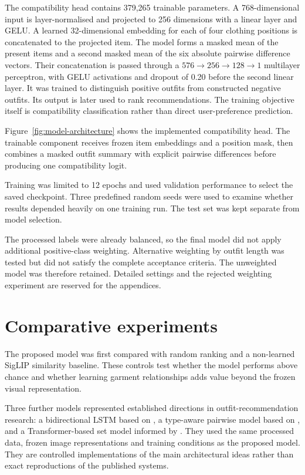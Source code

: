 The compatibility head contains 379,265 trainable parameters. A 768-dimensional
input is layer-normalised and projected to 256 dimensions with a linear layer
and GELU. A learned 32-dimensional embedding for each of four clothing
positions is concatenated to the projected item. The model forms a masked mean
of the present items and a second masked mean of the six absolute pairwise
difference vectors. Their concatenation is passed through a
$576\rightarrow256\rightarrow128\rightarrow1$ multilayer perceptron, with
GELU activations and dropout of 0.20 before the second linear layer. It was
trained to distinguish positive outfits from constructed negative outfits.
Its output is later used to rank recommendations. The training objective itself
is compatibility classification rather than direct user-preference prediction.

Figure~\ref{fig:model-architecture} shows the implemented compatibility head.
The trainable component receives frozen item embeddings and a position mask,
then combines a masked outfit summary with explicit pairwise differences before
producing one compatibility logit.



Training was limited to 12 epochs and used validation performance to select the
saved checkpoint. Three predefined random seeds were used to examine whether
results depended heavily on one training run. The test set was kept separate
from model selection.

The processed labels were already balanced, so the final model did not apply
additional positive-class weighting. Alternative weighting by outfit length
was tested but did not satisfy the complete acceptance criteria. The unweighted
model was therefore retained. Detailed settings and the rejected weighting
experiment are reserved for the appendices.

\section{Comparative experiments}

The proposed model was first compared with random ranking and a non-learned
SigLIP similarity baseline. These controls test whether the model performs
above chance and whether learning garment relationships adds value beyond the
frozen visual representation.

Three further models represented established directions in outfit-recommendation
research: a bidirectional LSTM based on \textcite{han2017bilstm}, a type-aware
pairwise model based on \textcite{vasileva2018typeaware}, and a
Transformer-based set model informed by \textcite{sarkar2023outfittransformer}.
They used the same processed data, frozen image representations and training
conditions as the proposed model. They are controlled implementations of the
main architectural ideas rather than exact reproductions of the published
systems.

